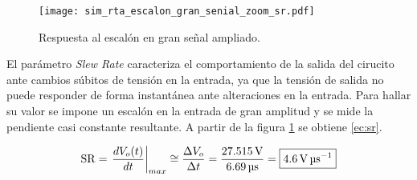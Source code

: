 \begin{figure}[H]
	\centering
	\texttt{[image: sim\_rta\_escalon\_gran\_senial\_zoom\_sr.pdf]}
	\caption{Respuesta al escalón en gran señal ampliado.}
	\label{fig:sim_rta_escalon_gran_sr}
\end{figure}

	El parámetro \textit{Slew Rate} caracteriza el comportamiento de la salida del cirucito ante cambios súbitos de tensión en la entrada, ya que la tensión de salida no puede responder de forma instantánea ante alteraciones en la entrada. Para hallar su valor se impone un escalón en la entrada de gran amplitud y se mide la pendiente casi constante resultante. A partir de la figura \ref{fig:sim_rta_escalon_gran_sr} se obtiene \eqref{ec:sr}.

	\begin{equation}
	\centering
	\mathrm{SR} = \left. \frac{dV_o(t)}{dt} \right\rvert_{max} \cong \frac{\Delta V_o}{\Delta t} = \frac{\SI{27.515}{\volt}}{\SI{6.69}{\micro\second}} = \boxed{\SI{4.6}{\volt\per\micro\second}}
	\label{ec:sr}
\end{equation}


